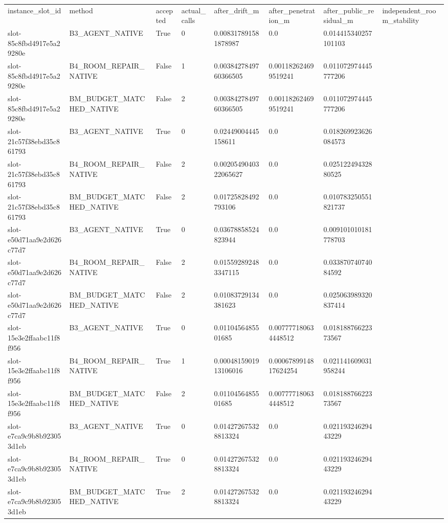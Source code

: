\begin{tabular}{llllllll}
instance\_slot\_id & method & accepted & actual\_calls & after\_drift\_m & after\_penetration\_m & after\_public\_residual\_m & independent\_room\_stability \\
slot-85c8fbd4917e5a29280e & B3\_AGENT\_NATIVE & True & 0 & 0.008317891581878987 & 0.0 & 0.014415340257101103 &  \\
slot-85c8fbd4917e5a29280e & B4\_ROOM\_REPAIR\_NATIVE & False & 1 & 0.0038427849760366505 & 0.001182624699519241 & 0.011072974445777206 &  \\
slot-85c8fbd4917e5a29280e & BM\_BUDGET\_MATCHED\_NATIVE & False & 2 & 0.0038427849760366505 & 0.001182624699519241 & 0.011072974445777206 &  \\
slot-21c57f38ebd35c861793 & B3\_AGENT\_NATIVE & True & 0 & 0.02449004445158611 & 0.0 & 0.018269923626084573 &  \\
slot-21c57f38ebd35c861793 & B4\_ROOM\_REPAIR\_NATIVE & False & 2 & 0.0020549040322065627 & 0.0 & 0.02512249432880525 &  \\
slot-21c57f38ebd35c861793 & BM\_BUDGET\_MATCHED\_NATIVE & False & 2 & 0.01725828492793106 & 0.0 & 0.010783250551821737 &  \\
slot-e50d71aa9e2d626c77d7 & B3\_AGENT\_NATIVE & True & 0 & 0.03678858524823944 & 0.0 & 0.009101010181778703 &  \\
slot-e50d71aa9e2d626c77d7 & B4\_ROOM\_REPAIR\_NATIVE & False & 2 & 0.015592892483347115 & 0.0 & 0.03387074074084592 &  \\
slot-e50d71aa9e2d626c77d7 & BM\_BUDGET\_MATCHED\_NATIVE & False & 2 & 0.01083729134381623 & 0.0 & 0.025063989320837414 &  \\
slot-15e3e2ffaabc11f8f956 & B3\_AGENT\_NATIVE & True & 0 & 0.0110456485501685 & 0.007777180634448512 & 0.01818876622373567 &  \\
slot-15e3e2ffaabc11f8f956 & B4\_ROOM\_REPAIR\_NATIVE & True & 1 & 0.0004815901913106016 & 0.0006789914817624254 & 0.021141609031958244 &  \\
slot-15e3e2ffaabc11f8f956 & BM\_BUDGET\_MATCHED\_NATIVE & False & 2 & 0.0110456485501685 & 0.007777180634448512 & 0.01818876622373567 &  \\
slot-e7ca9c9b8b923053d1eb & B3\_AGENT\_NATIVE & True & 0 & 0.014272675328813324 & 0.0 & 0.02119324629443229 &  \\
slot-e7ca9c9b8b923053d1eb & B4\_ROOM\_REPAIR\_NATIVE & True & 0 & 0.014272675328813324 & 0.0 & 0.02119324629443229 &  \\
slot-e7ca9c9b8b923053d1eb & BM\_BUDGET\_MATCHED\_NATIVE & True & 2 & 0.014272675328813324 & 0.0 & 0.02119324629443229 &  \\
\end{tabular}
